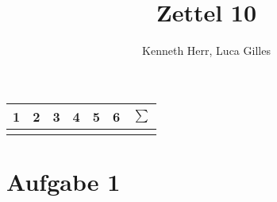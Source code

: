 \documentclass{article}
\author{Kenneth Herr, Luca Gilles}
\title{Zettel 10}
\begin{document}

\begin{table} [t!]
  \begin{tabular}{c | c | c | c | c | c | c}
    1   & 2 & 3 & 4 &  5 & 6 & \(\sum\) \\
    \hline
      &   &   &    &  & & \\
    \end{tabular}
  \end{table}

  \maketitle
  \section{Aufgabe 1}
\end{document}
